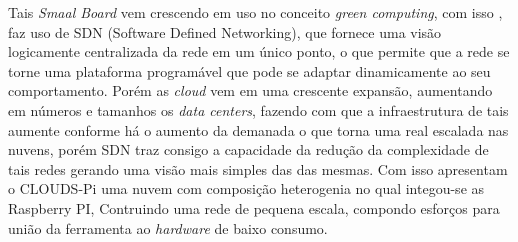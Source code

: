 \documentclass[12pt]{article}
\begin{document}
  Tais \textit{Smaal Board} vem crescendo em uso no conceito \textit{green computing}, com isso \cite{2018CLOUDSPiA}, faz uso de SDN (Software Defined Networking), que fornece uma visão logicamente centralizada da rede em um único ponto, o que permite que a rede se torne uma plataforma programável que pode se adaptar dinamicamente ao seu comportamento. Porém as \textit{cloud} vem em uma crescente expansão, aumentando em números e tamanhos os \textit{data centers}, fazendo com que a infraestrutura de tais aumente conforme há o aumento da demanada o que torna uma real escalada nas nuvens, porém SDN traz consigo a capacidade da redução da complexidade de tais redes gerando uma visão mais simples das das mesmas. Com isso apresentam o CLOUDS-Pi uma nuvem com composição heterogenia no qual integou-se as Raspberry PI, Contruindo uma rede de pequena escala, compondo esforços para união da ferramenta ao \textit{hardware} de baixo consumo.\\    
\end{document}
